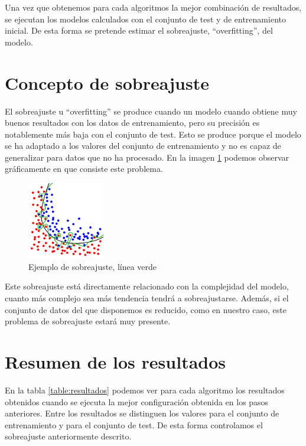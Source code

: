 Una vez que obtenemos para cada algoritmos la mejor combinación de resultados, se ejecutan los modelos calculados con el conjunto de test y de entrenamiento inicial. De esta forma se pretende estimar el sobreajuste, ``overfitting'', del modelo. 

\section{Concepto de sobreajuste}
\label{section:sobreajuste}
El sobreajuste u ``overfitting'' se produce cuando un modelo cuando obtiene muy buenos resultados  con los datos de entrenamiento, pero su precisión es notablemente más baja con el conjunto de test. Esto se produce porque el modelo se ha adaptado a los valores del conjunto de entrenamiento y no es capaz de generalizar para datos que no ha procesado. En la imagen \ref{figure:sobreajuste} podemos observar gráficamente en que consiste este problema.

\begin{figure}[H]
\centering
\includegraphics[width=0.3\textwidth]{figs/Overfitting.png}
\caption{Ejemplo de sobreajuste, línea verde \cite{SobreajusteLibre}}
\label{figure:sobreajuste}
\end{figure}

Este sobreajuste está directamente relacionado con la complejidad del modelo, cuanto más complejo sea más tendencia tendrá a sobreajustarse. Además, si el conjunto de datos del que disponemos es reducido, como en nuestro caso, este problema de sobreajuste estará muy presente.

\section{Resumen de los resultados}

En la tabla \ref{table:resultados} podemos ver para cada algoritmo los resultados obtenidos cuando se ejecuta la mejor configuración obtenida en los pasos anteriores. Entre los resultados se distinguen los valores para el conjunto de entrenamiento y para el conjunto de test. De esta forma controlamos el sobreajuste anteriormente descrito.


